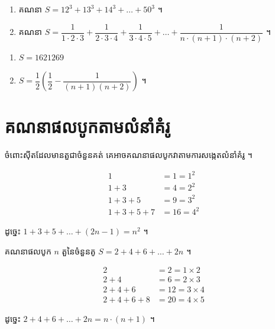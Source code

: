 \begin{pro}
\begin{enumerate}[1]
  \item គណនា $S = 12^3 + 13^3 + 14^3 + \ldots + 50^3$ ។
  \item គណនា $S = \dfrac{1}{1 \cdot 2 \cdot 3} + \dfrac{1}{2 \cdot 3 \cdot 4} + \dfrac{1}{3 \cdot 4 \cdot 5} + \ldots + \dfrac{1}{n \cdot (n+1) \cdot (n+2)}$ ។
\end{enumerate}
\ans
\begin{enumerate}[1]
  \item $S = 1621269$
  \item $S = \dfrac{1}{2}\left(\dfrac{1}{2} - \dfrac{1}{(n+1)(n+2)}\right)$ ។
\end{enumerate}
\end{pro}

\section{គណនាផលបូកតាមលំនាំគំរូ}

ចំពោះស៊ីតដែលមានតួជាចំនួនគត់ គេអាចគណនាផលបូកវាតាមការសង្កេតលំនាំគំរូ ។

\begin{example}[ឧទាហរណ៍]
\[
\begin{aligned}
1 &= 1 = 1^2\\
1 + 3 &= 4 = 2^2\\
1 + 3 + 5 &= 9 = 3^2\\
1 + 3 + 5 + 7 &= 16 = 4^2
\end{aligned}
\]
\begin{center}
\end{center}
ដូច្នេះ $1 + 3 + 5 + \ldots + (2n - 1) = n^2$ ។
\end{example}

\begin{example}[លំហាត់គំរូ]
គណនាផលបូក $n$ តួនៃចំនួនគូ $S = 2 + 4 + 6 + \ldots + 2n$ ។
\end{example}
\ans
\[
\begin{aligned}
2 &= 2 = 1 \times 2\\
2 + 4 &= 6 = 2 \times 3\\
2 + 4 + 6 &= 12 = 3 \times 4\\
2 + 4 + 6 + 8 &= 20 = 4 \times 5
\end{aligned}
\]
\begin{center}
\end{center}
ដូច្នេះ $2 + 4 + 6 + \ldots + 2n = n \cdot (n + 1)$ ។

